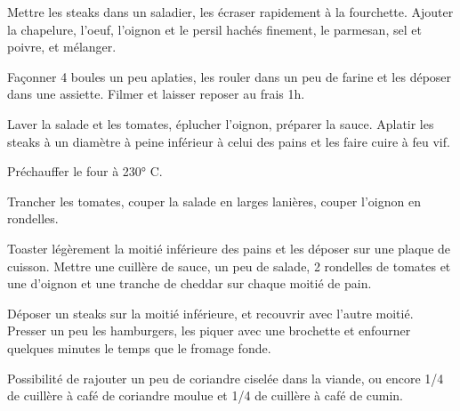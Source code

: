\begin{etapes}
\item Mettre les steaks dans un saladier, les \'ecraser rapidement \`a la fourchette. Ajouter la chapelure, l'oeuf, l'oignon et le persil hach\'es finement, le parmesan, sel et poivre, et m\'elanger. 
\item Façonner 4 boules un peu aplaties, les rouler dans un peu de farine et les d\'eposer dans une assiette. Filmer et laisser reposer au frais 1h.
\item Laver la salade et les tomates, \'eplucher l'oignon, pr\'eparer la sauce. Aplatir les steaks \`a un diam\`etre \`a peine inf\'erieur \`a celui des pains et les faire cuire \`a feu vif.
\item Pr\'echauffer le four \`a 230° C. 
\item Trancher les tomates, couper la salade en larges lani\`eres, couper l'oignon en rondelles. 
\item Toaster l\'eg\`erement la moiti\'e inf\'erieure des pains et les d\'eposer sur une plaque de cuisson. Mettre une cuill\`ere de sauce, un peu de salade, 2 rondelles de tomates et une d'oignon et une tranche de cheddar sur chaque moiti\'e de pain. 
\item D\'eposer un steaks sur la moiti\'e inf\'erieure, et recouvrir avec l'autre moiti\'e. Presser un peu les hamburgers, les piquer avec une brochette et enfourner quelques minutes le temps que le fromage fonde.
\end{etapes}
\begin{conseils}
Possibilit\'e de rajouter un peu de coriandre cisel\'ee dans la viande, ou encore 1/4 de cuill\`ere \`a caf\'e de coriandre moulue et 1/4 de cuill\`ere \`a caf\'e de cumin.
\end{conseils}
